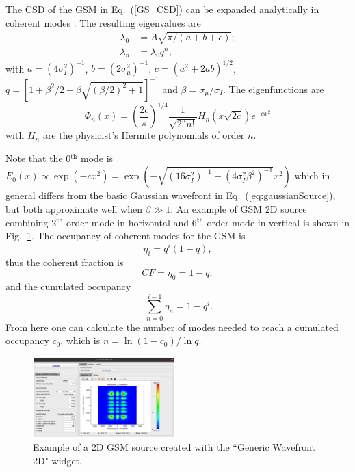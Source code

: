 \documentclass{iopconfser}
\begin{document}
The CSD of the GSM in Eq.~(\ref{GS_CSD}) can be expanded analytically in coherent modes \cite{Starikov82}. The resulting eigenvalues are
\begin{align}
\lambda_0 &= A \sqrt{\pi/( a+b+c)}; \\ 
\lambda_n &= \lambda_0 q ^n,
\end{align}
with $a = (4 \sigma_I^2)^{-1}$, $ 
b = (2 \sigma_{\mu}^2)^{-1}$, $ 
c = (a^2 + 2 a b)^{1/2}$,
$q = [1 + \beta^2/2 + \beta\sqrt{(\beta/2)^2+1}]^{-1}$ 
and $\beta=\sigma_{\mu}/\sigma_I$.
The eigenfunctions are
\begin{equation}
\Phi_n(x) = \left( \frac{2c}{\pi} \right)^{1/4} \frac{1}{\sqrt{2^n n!}} H_n(x\sqrt{2c})e^{-cx^2}
\label{GSeigenvalues}
\end{equation}
with $H_n$ are the physicist's Hermite polynomials of order $n$. 

Note that the 0$^\text{th}$ mode is $E_0(x) \propto \exp(-c x^2) = \exp(-\sqrt{(16 \sigma_I^2)^{-1} + (4 \sigma_I^2 \beta^2)^{-1}} x^2)$ which in general differs from the basic Gaussian wavefront in Eq.~(\ref{eq:gaussianSource}), but both approximate well when $\beta \gg 1$. An example of GSM 2D source combining 2$^\text{th}$ order mode in horizontal and 6$^\text{th}$ order mode in vertical is shown in Fig.~\ref{fig:GSM2D}.
The occupancy of coherent modes for the GSM is   
\begin{equation}\label{eq:GSMoccupancy}
\eta_i = q^i(1-q), 
\end{equation}
thus the coherent fraction is 
\begin{equation}\label{eq:GSMcoherentfraction}
    CF=\eta_0=1-q,
\end{equation}
and the cumulated occupancy
\begin{equation}\label{eq:GSMcumulatedoccupancy}
\ \sum_{n=0}^{i-1} \eta_n = 1-q^i.
\end{equation}
From here one can calculate the number of modes needed to reach a cumulated occupancy $c_0$, which is $n=\ln(1-c_0)/\ln q$.

\begin{figure}
    \centering
    \includegraphics[width=0.49\textwidth]{figures/GSM2D.png}
        
    \caption{Example of a 2D GSM source created with the ``Generic Wavefront 2D" widget.}
    \label{fig:GSM2D}
\end{figure}
\end{document}

